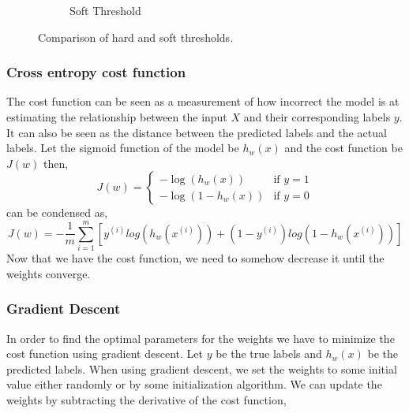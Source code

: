 \begin{figure}
\begin{subfigure}{.5\textwidth}
  \caption{Soft Threshold}
  \label{fig:soft-threshold}
\end{subfigure}
\caption{Comparison of hard and soft thresholds\cite{10.5555/1671238}.}
\label{fig:thresholds}
\end{figure}
\subsubsection{Cross entropy cost function}
The cost function can be seen as a measurement of how incorrect the model is at estimating the relationship between the input $X$ and their corresponding labels $y$. It can also be seen as the distance between the predicted labels and the actual labels.
Let the sigmoid function of the model be $h_{w}(x)$ and the cost function be $J(w)$ then,
\abovedisplayskip=0pt\relax
\[
J(w) =
\begin{cases}
-\log(h_{w}(x)) & \text{if } y=1\\
-\log(1 - h_{w}(x)) & \text{if } y=0
\end{cases}
\]
can be condensed as,
\begin{equation}
J(w) = - \frac{1}{m} \sum_{i=1}^{m} \left[ y^{(i)}log(h_{w}(x^{(i)})) + (1 - y^{(i)})log(1-h_{w}(x^{(i)}))\right]
\end{equation}
Now that we have the cost function, we need to somehow decrease it until the weights converge.

\subsubsection{Gradient Descent}
In order to find the optimal parameters for the weights we have to minimize the cost function using gradient descent. Let $y$ be the true labels and $h_{w}(x)$ be the predicted labels. When using gradient descent, we set the weights to some initial value either randomly or by some initialization algorithm. We can update the weights by subtracting the derivative of the cost function,

